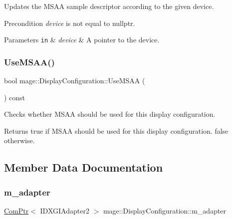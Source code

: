 Updates the M\+S\+AA sample descriptor according to the given device.

\begin{DoxyPrecond}{Precondition}
{\itshape device} is not equal to {\ttfamily nullptr}. 
\end{DoxyPrecond}

\begin{DoxyParams}[1]{Parameters}
\mbox{\tt in}  & {\em device} & A pointer to the device. \\
\hline
\end{DoxyParams}
\hypertarget{structmage_1_1_display_configuration_a7bf7445c7242fc8d943b04d1975cfa72}{}\label{structmage_1_1_display_configuration_a7bf7445c7242fc8d943b04d1975cfa72} 
\subsubsection{\texorpdfstring{Use\+M\+S\+A\+A()}{UseMSAA()}}
{\footnotesize\ttfamily bool mage\+::\+Display\+Configuration\+::\+Use\+M\+S\+AA (\begin{DoxyParamCaption}{ }\end{DoxyParamCaption}) const\hspace{0.3cm}{\ttfamily [noexcept]}}

Checks whether M\+S\+AA should be used for this display configuration.

\begin{DoxyReturn}{Returns}
{\ttfamily true} if M\+S\+AA should be used for this display configuration. {\ttfamily false} otherwise. 
\end{DoxyReturn}


\subsection{Member Data Documentation}
\hypertarget{structmage_1_1_display_configuration_a3a731fa68cb3924f0528115930073d77}{}\label{structmage_1_1_display_configuration_a3a731fa68cb3924f0528115930073d77} 
\subsubsection{\texorpdfstring{m\+\_\+adapter}{m\_adapter}}
{\footnotesize\ttfamily \hyperlink{namespacemage_ae74f374780900893caa5555d1031fd79}{Com\+Ptr}$<$ I\+D\+X\+G\+I\+Adapter2 $>$ mage\+::\+Display\+Configuration\+::m\+\_\+adapter\hspace{0.3cm}{\ttfamily [private]}}

